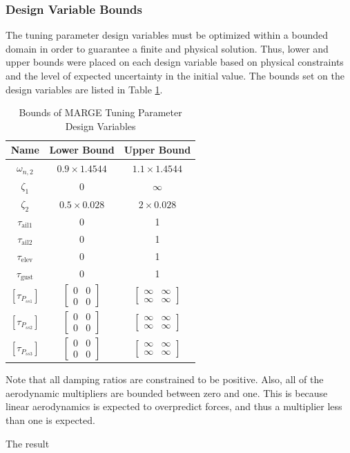 \subsubsection{Design Variable Bounds} %
The tuning parameter design variables must be optimized within a bounded domain in order to guarantee a finite and physical solution. Thus, lower and upper bounds were placed on each design variable based on physical constraints and the level of expected uncertainty in the initial value. The bounds set on the design variables are listed in Table \ref{tab:optBounds}.
\begin{table}[H]
	\centering
	\label{tab:optBounds}
	\caption{Bounds of MARGE Tuning Parameter Design Variables}
	\begin{tabular}{ccc}
		\hline\hline
		Name & Lower Bound & Upper Bound \\
		\hline
		$\omega_{n,2}$ & $0.9\times1.4544$ & $1.1\times1.4544$ \\
		$\zeta_1$ & 0 & $\infty$ \\
		$\zeta_2$ & $0.5\times0.028$ & $2\times0.028$ \\
		$\tau_\text{ail1}$ & 0 & 1 \\
		$\tau_\text{ail2}$ & 0 & 1 \\
		$\tau_\text{elev}$ & 0 & 1 \\
		$\tau_\text{gust}$ & 0 & 1 \\
		$\left[\tau_{P_{ss1}}\right]$ & $\begin{bmatrix} 0 & 0 \\ 0 & 0 \end{bmatrix}$ & $\begin{bmatrix} \infty & \infty \\ \infty & \infty \end{bmatrix}$ \\
		$\left[\tau_{P_{ss2}}\right]$ & $\begin{bmatrix} 0 & 0 \\ 0 & 0 \end{bmatrix}$ & $\begin{bmatrix} \infty & \infty \\ \infty & \infty \end{bmatrix}$ \\
		$\left[\tau_{P_{ss3}}\right]$ & $\begin{bmatrix} 0 & 0 \\ 0 & 0 \end{bmatrix}$ & $\begin{bmatrix} \infty & \infty \\ \infty & \infty \end{bmatrix}$ \\
		\hline\hline
	\end{tabular}
\end{table}
Note that all damping ratios are constrained to be positive. Also, all of the aerodynamic multipliers are bounded between zero and one. This is because linear aerodynamics is expected to overpredict forces, and thus a multiplier less than one is expected.

The result

